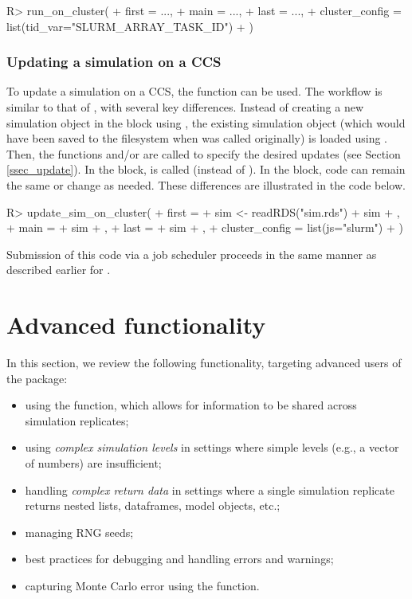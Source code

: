 \begin{example}
R> run_on_cluster(
+    first = {...},
+    main = {...},
+    last = {...},
+    cluster_config = list(tid_var="SLURM_ARRAY_TASK_ID")
+  )
\end{example}

\subsubsection{Updating a simulation on a CCS}\label{sssec_update_sim_on_cluster}

To update a simulation on a CCS, the  function can be used. The workflow is similar to that of , with several key differences. Instead of creating a new simulation object in the  block using , the existing simulation object (which would have been saved to the filesystem when  was called originally) is loaded using . Then, the functions  and/or  are called to specify the desired updates (see Section \ref{ssec_update}). In the  block,  is called (instead of ). In the  block, code can remain the same or change as needed. These differences are illustrated in the code below.

\begin{example}
R> update_sim_on_cluster(
+    first = {
+      sim <- readRDS("sim.rds")
+      sim %
+    },
+    main = {
+      sim %
+    },
+    last = {
+      sim %
+    },
+    cluster_config = list(js="slurm")
+  )
\end{example}

Submission of this code via a job scheduler proceeds in the same manner as described earlier for .

\section{Advanced functionality}\label{sec:advanced}

In this section, we review the following functionality, targeting advanced users of the package:

\begin{itemize}
  \item using the  function, which allows for information to be shared across simulation replicates;
  \item using \textit{complex simulation levels} in settings where simple levels (e.g., a vector of numbers) are insufficient;
  \item handling \textit{complex return data} in settings where a single simulation replicate returns nested lists, dataframes, model objects, etc.;
  \item managing RNG seeds;
  \item best practices for debugging and handling errors and warnings;
  \item capturing Monte Carlo error using the  function.
\end{itemize}

